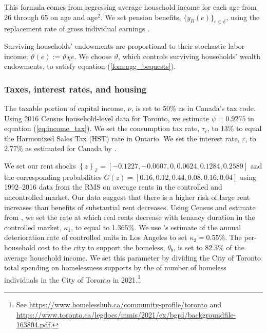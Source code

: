 \documentclass[parskip=full]{article}
\begin{document}
\noindent This formula comes from regressing average household income for each age from 26 through 65 on age and age$^{2}$. We set pension benefits, $\{y_{R}(e)\}_{e\in \mathcal{E}}$, using the replacement rate of gross individual earnings \citep{OECD-pension}. 

Surviving households' endowments are proportional to their stochastic labor income: $\vartheta(e):=\vartheta \chi e$. We choose $\vartheta$, which controls surviving households' wealth endowments, to satisfy equation (\ref{lom:agg_bequests}).

\subsubsection{Taxes, interest rates, and housing}

The taxable portion of capital income, $\nu$, is set to 50\% as in Canada's tax code. Using 2016 Census household-level data for Toronto, we estimate $\psi=0.9275$ in equation (\ref{eq:income_tax}). We set the consumption tax rate, $\tau_{c}$, to 13\% to equal the Harmonized Sales Tax (HST) rate in Ontario. We set the interest rate, $r$, to 2.77\% as estimated for Canada by \citet{bruneau-etal-2018}. 

We set our rent shocks $\left\{z\right\}_{\mathbb{Z}}=\left[-0.1227,-0.0607,0,0.0624,0.1284,0.2589\right]$ and the corresponding probabilities $G(z)=\left[0.16,0.12,0.44,0.08,0.16,0.04\right]$ using 1992–2016 data from the RMS on average rents in the controlled and uncontrolled market. Our data suggest that there is a higher risk of large rent increases than benefits of substantial rent decreases. Using Census and estimate from \citet{zhang-gou}, we set the rate at which real rents decrease with tenancy duration in the controlled market, $\kappa_{1}$, to equal to 1.365\%. We use \citet{murray_et_al-1991}'s estimate of the annual deterioration rate of controlled units in Los Angeles to set $\kappa_{2}=0.55\%$. The per-household cost to the city to support the homeless, $\theta_{b}$, is set to 82.3\% of the average household income. We set this parameter by dividing the City of Toronto total spending on homelessness supports by the of number of homeless individuals in the City of Toronto in 2021.\footnote{See \url{https://www.homelesshub.ca/community-profile/toronto} and \url{https://www.toronto.ca/legdocs/mmis/2021/ex/bgrd/backgroundfile-163804.pdf}.}
\end{document}

